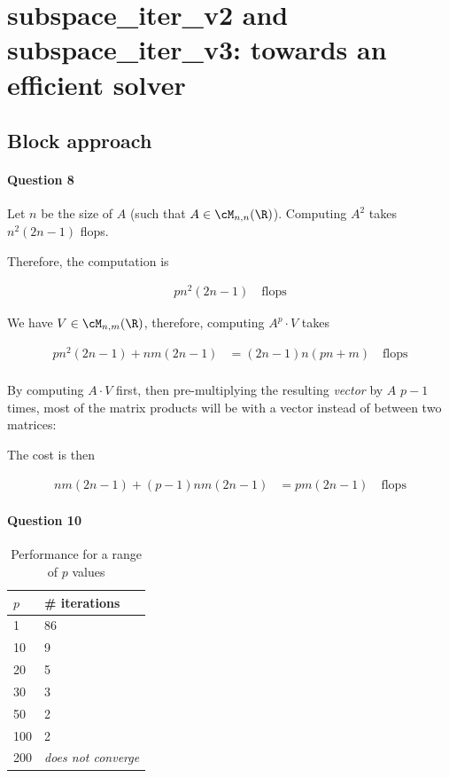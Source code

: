 \documentclass{article}
\begin{document}
\section{subspace_iter_v2 and subspace_iter_v3: towards an efficient solver}

\subsection{Block approach}

\paragraph{Question 8}

Let $n$ be the size of $A$ (such that $A \in \cM_{n, n}(\R)$). Computing $A^2$ takes $n^2(2n-1)$ flops.

Therefore, the computation is

\begin{align*}
	p n^2 (2n-1) \quad \text{flops}
\end{align*}

We have $V \in \cM_{n, m}(\R)$, therefore, computing $A^{p} \cdot V$ takes

\begin{align*}
	pn^2(2n-1) + nm(2n-1) &= (2n-1)n(pn+m) \quad \text{flops} \\
\end{align*}

By computing $A \cdot V$ first, then pre-multiplying the resulting \emph{vector} by $A$ $p-1$ times, most of the matrix products will be with a vector instead of between two matrices:

The cost is then

\begin{align*}
	nm(2n-1) + (p-1)nm(2n-1) &= pm(2n-1)  \quad \text{flops}
\end{align*}



\paragraph{Question 10}

\begin{table}[H]
	\centering
	\caption{Performance for a range of $p$ values}
	\label{tab:perf-p-values}
	\begin{tabular}{l|l}
		$p$ & # iterations \\\hline
		1  & 86   \\
		10 & 9  \\
		20 & 5  \\
		30 & 3  \\
		50 & 2  \\
		100 & 2  \\
		200 & \emph{does not converge} 
	\end{tabular}
\end{table}
\end{document}
